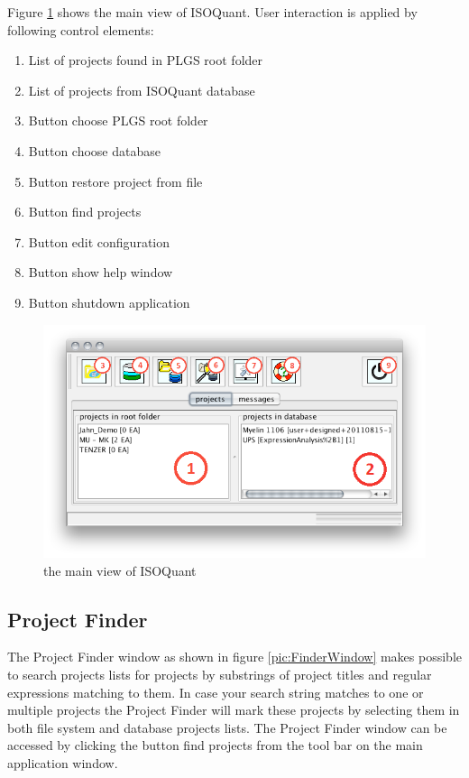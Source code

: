 \documentclass[]{article}
\providecommand{\tightlist}{%
  \setlength{\itemsep}{0pt}\setlength{\parskip}{0pt}}
\begin{document}
Figure \ref{pic:mainView} shows the main view of ISOQuant. User
interaction is applied by following control elements:

\begin{enumerate}
\def\labelenumi{\arabic{enumi}.}
\tightlist
\item
  List of projects found in PLGS root folder
\item
  List of projects from ISOQuant database
\item
  Button choose PLGS root folder
\item
  Button choose database
\item
  Button restore project from file
\item
  Button find projects
\item
  Button edit configuration
\item
  Button show help window
\item
  Button shutdown application
\end{enumerate}

\begin{figure}[htbp]
\centering
\includegraphics{pic/gui.png}
\caption{the main view of ISOQuant \label{pic:mainView}}
\end{figure}

\clearpage

\subsection{Project Finder}\label{project-finder}

The Project Finder window as shown in figure \ref{pic:FinderWindow}
makes possible to search projects lists for projects by substrings of
project titles and regular expressions matching to them. In case your
search string matches to one or multiple projects the Project Finder
will mark these projects by selecting them in both file system and
database projects lists. The Project Finder window can be accessed by
clicking the button find projects from the tool bar on the main
application window.
\end{document}
